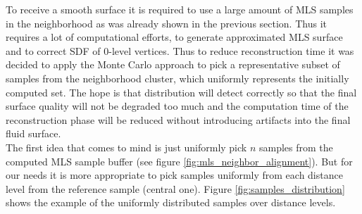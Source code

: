To receive a smooth surface it is required to use a large amount of MLS samples in the neighborhood as was already shown in the previous section. Thus it requires a lot of computational efforts, to generate approximated MLS surface and to correct SDF of 0-level vertices. Thus to reduce reconstruction time it was decided to apply the Monte Carlo approach to pick a representative subset of samples from the neighborhood cluster, which uniformly represents the initially computed set. The hope is that distribution will detect correctly so that the final surface quality will not be degraded too much and the computation time of the reconstruction phase will be reduced without introducing artifacts into the final fluid surface.\\
The first idea that comes to mind is just uniformly pick $n$ samples from the computed MLS sample buffer (see figure \ref{fig:mls_neighbor_alignment}). But for our needs it is more appropriate to pick samples uniformly from each distance level from the reference sample (central one). Figure \ref{fig:samples_distribution} shows the example of the uniformly distributed samples over distance levels.
